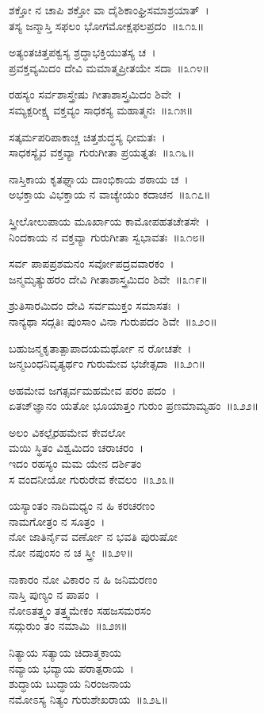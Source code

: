ಶಕ್ತೋ ನ ಚಾಪಿ ಶಕ್ತೋ ವಾ ದೈಶಿಕಾಂಘ್ರಿಸಮಾಶ್ರಯಾತ್~।\\
ತಸ್ಯ ಜನ್ಮಾಸ್ತಿ ಸಫಲಂ ಭೋಗಮೋಕ್ಷಫಲಪ್ರದಂ~॥೩೧೩॥

ಅತ್ಯಂತಚಿತ್ತಪಕ್ವಸ್ಯ ಶ್ರದ್ಧಾಭಕ್ತಿಯುತಸ್ಯ ಚ~।\\
ಪ್ರವಕ್ತವ್ಯಮಿದಂ ದೇವಿ ಮಮಾತ್ಮಪ್ರೀತಯೇ ಸದಾ~॥೩೧೪॥

ರಹಸ್ಯಂ ಸರ್ವಶಾಸ್ತ್ರೇಷು ಗೀತಾಶಾಸ್ತ್ರಮಿದಂ ಶಿವೇ~।\\
ಸಮ್ಯಕ್ಪರೀಕ್ಷ್ಯ ವಕ್ತವ್ಯಂ ಸಾಧಕಸ್ಯ ಮಹಾತ್ಮನಃ~॥೩೧೫॥

ಸತ್ಕರ್ಮಪರಿಪಾಕಾಚ್ಚ ಚಿತ್ತಶುದ್ಧಸ್ಯ ಧೀಮತಃ~।\\
ಸಾಧಕಸ್ಯೈವ ವಕ್ತವ್ಯಾ ಗುರುಗೀತಾ ಪ್ರಯತ್ನತಃ~॥೩೧೬॥

ನಾಸ್ತಿಕಾಯ ಕೃತಘ್ನಾಯ ದಾಂಭಿಕಾಯ ಶಠಾಯ ಚ~।\\
ಅಭಕ್ತಾಯ ವಿಭಕ್ತಾಯ ನ ವಾಚ್ಯೇಯಂ ಕದಾಚನ~॥೩೧೭॥

ಸ್ತ್ರೀಲೋಲುಪಾಯ ಮೂರ್ಖಾಯ ಕಾಮೋಪಹತಚೇತಸೇ~।\\
ನಿಂದಕಾಯ ನ ವಕ್ತವ್ಯಾ ಗುರುಗೀತಾ ಸ್ವಭಾವತಃ~॥೩೧೮॥

ಸರ್ವ ಪಾಪಪ್ರಶಮನಂ ಸರ್ವೋಪದ್ರವವಾರಕಂ~।\\
ಜನ್ಮಮೃತ್ಯುಹರಂ ದೇವಿ ಗೀತಾಶಾಸ್ತ್ರಮಿದಂ ಶಿವೇ~॥೩೧೯॥

ಶ್ರುತಿಸಾರಮಿದಂ ದೇವಿ ಸರ್ವಮುಕ್ತಂ ಸಮಾಸತಃ~।\\
ನಾನ್ಯಥಾ ಸದ್ಗತಿಃ ಪುಂಸಾಂ ವಿನಾ ಗುರುಪದಂ ಶಿವೇ~॥೩೨೦॥

ಬಹುಜನ್ಮಕೃತಾತ್ಪಾಪಾದಯಮರ್ಥೋ ನ ರೋಚತೇ~।\\
ಜನ್ಮಬಂಧನಿವೃತ್ಯರ್ಥಂ ಗುರುಮೇವ ಭಜೇತ್ಸದಾ~॥೩೨೧॥

ಅಹಮೇವ ಜಗತ್ಸರ್ವಮಹಮೇವ ಪರಂ ಪದಂ~।\\
ಏತಜ್‌ಜ್ಞಾನಂ ಯತೋ ಭೂಯಾತ್ತಂ ಗುರುಂ ಪ್ರಣಮಾಮ್ಯಹಂ~॥೩೨೨॥

ಅಲಂ ವಿಕಲ್ಪೈರಹಮೇವ ಕೇವಲೋ\\ ಮಯಿ ಸ್ಥಿತಂ ವಿಶ್ವಮಿದಂ ಚರಾಚರಂ~।\\
ಇದಂ ರಹಸ್ಯಂ ಮಮ ಯೇನ ದರ್ಶಿತಂ\\ ಸ ವಂದನೀಯೋ ಗುರುರೇವ ಕೇವಲಂ~॥೩೨೩॥

ಯಸ್ಯಾಂತಂ ನಾದಿಮಧ್ಯಂ ನ ಹಿ ಕರಚರಣಂ \\ನಾಮಗೋತ್ರಂ ನ ಸೂತ್ರಂ~।\\
ನೋ ಜಾತಿರ್ನೈವ ವರ್ಣೋ ನ ಭವತಿ ಪುರುಷೋ\\ ನೋ ನಪುಂಸಂ ನ ಚ ಸ್ತ್ರೀ~॥೩೨೪॥

ನಾಕಾರಂ ನೋ ವಿಕಾರಂ ನ ಹಿ ಜನಿಮರಣಂ \\ನಾಸ್ತಿ ಪುಣ್ಯಂ ನ ಪಾಪಂ~।\\
ನೋಽತತ್ತ್ವಂ ತತ್ತ್ವಮೇಕಂ ಸಹಜಸಮರಸಂ \\ಸದ್ಗುರುಂ ತಂ ನಮಾಮಿ~॥೩೨೫॥

ನಿತ್ಯಾಯ ಸತ್ಯಾಯ ಚಿದಾತ್ಮಕಾಯ \\ನವ್ಯಾಯ ಭವ್ಯಾಯ ಪರಾತ್ಪರಾಯ~।\\
ಶುದ್ಧಾಯ ಬುದ್ಧಾಯ ನಿರಂಜನಾಯ\\ ನಮೋಽಸ್ಯ ನಿತ್ಯಂ ಗುರುಶೇಖರಾಯ~॥೩೨೬॥

